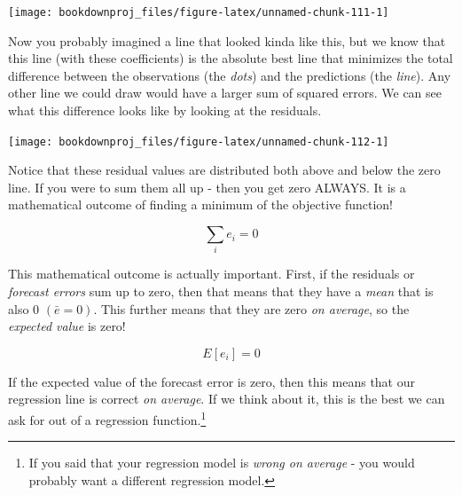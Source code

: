 \documentclass[
]{book}
\newenvironment{Shaded}{\begin{snugshade}}{\end{snugshade}}
\newcommand{\AttributeTok}[1]{\textcolor[rgb]{0.77,0.63,0.00}{#1}}
\newcommand{\DecValTok}[1]{\textcolor[rgb]{0.00,0.00,0.81}{#1}}
\newcommand{\FunctionTok}[1]{\textcolor[rgb]{0.00,0.00,0.00}{#1}}
\newcommand{\NormalTok}[1]{#1}
\newcommand{\SpecialCharTok}[1]{\textcolor[rgb]{0.00,0.00,0.00}{#1}}
\newcommand{\StringTok}[1]{\textcolor[rgb]{0.31,0.60,0.02}{#1}}
\begin{document}
\begin{center}\texttt{[image: bookdownproj\_files/figure-latex/unnamed-chunk-111-1]} \end{center}

Now you probably imagined a line that looked kinda like this, but we know that this line (with these coefficients) is the absolute best line that minimizes the total difference between the observations (the \emph{dots}) and the predictions (the \emph{line}). Any other line we could draw would have a larger sum of squared errors. We can see what this difference looks like by looking at the residuals.

\begin{Shaded}
\end{Shaded}

\begin{center}\texttt{[image: bookdownproj\_files/figure-latex/unnamed-chunk-112-1]} \end{center}

Notice that these residual values are distributed both above and below the zero line. If you were to sum them all up - then you get zero ALWAYS. It is a mathematical outcome of finding a minimum of the objective function!

\[\sum_ie_i=0\]

This mathematical outcome is actually important. First, if the residuals or \emph{forecast errors} sum up to zero, then that means that they have a \emph{mean} that is also 0 \((\bar{e}=0)\). This further means that they are zero \emph{on average}, so the \emph{expected value} is zero!

\[E[e_i]=0\]

If the expected value of the forecast error is zero, then this means that our regression line is correct \emph{on average}. If we think about it, this is the best we can ask for out of a regression function.\footnote{If you said that your regression model is \emph{wrong on average} - you would probably want a different regression model.}
\end{document}
